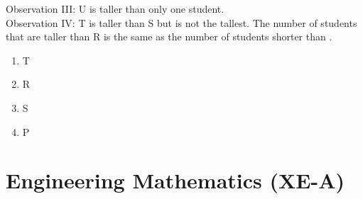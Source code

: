 \documentclass[journal,12pt,onecolumn]{IEEEtran}
\theoremstyle{remark}
\begin{document}
\begin{enumerate}
    Observation III: U is taller than only one student. \\
    Observation IV: T is taller than S but is not the tallest.
    The number of students that are taller than R is the same as the number of students shorter than {\underline{\hspace{2cm}}}.
    \begin{enumerate}
        \item T
        \item R
        \item S
        \item P
    \end{enumerate}
\end{enumerate}
\section*{Engineering Mathematics (XE-A)}
\end{document}
